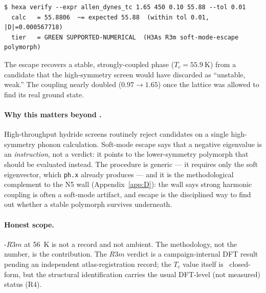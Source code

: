 \begin{lstlisting}[basicstyle=\ttfamily\footnotesize,frame=single,xleftmargin=0pt]
$ hexa verify --expr allen_dynes_tc 1.65 450 0.10 55.88 --tol 0.01
  calc   = 55.8806  ~= expected 55.88  (within tol 0.01, |D|=0.000567718)
  tier   = GREEN SUPPORTED-NUMERICAL  (H3As R3m soft-mode-escape polymorph)
\end{lstlisting}

\noindent The escape recovers a stable, strongly-coupled phase
($T_c = \SI{55.9}{\kelvin}$) from a candidate that the high-symmetry screen
would have discarded as ``unstable, weak.'' The coupling nearly doubled
($0.97 \to 1.65$) once the lattice was allowed to find its real ground state.

\paragraph{Why this matters beyond .}
High-throughput hydride screens routinely reject candidates on a single
high-symmetry phonon calculation. Soft-mode escape says that a negative
eigenvalue is an \emph{instruction}, not a verdict: it points to the
lower-symmetry polymorph that should be evaluated instead. The procedure is
generic --- it requires only the soft eigenvector, which \texttt{ph.x}
already produces --- and it is the methodological complement to the N5 wall
(Appendix~\ref{app:D}): the wall says strong harmonic coupling is often a
soft-mode artifact, and escape is the disciplined way to find out whether a
stable polymorph survives underneath.

\paragraph{Honest scope.}
-$R3m$ at \SI{56}{\kelvin} is not a record and not ambient. The
methodology, not the number, is the contribution. The $R3m$ verdict is a
campaign-internal DFT result pending an independent atlas-registration
record; the $T_c$ value itself is \tierGreen\ closed-form, but the structural
identification carries the usual DFT-level (not measured) status (R4).
